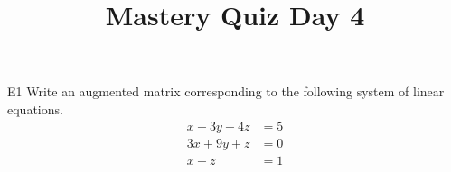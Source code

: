 \documentclass{sbgLAquiz}
\title{Mastery Quiz Day 4 }
\begin{document}
\begin{problem}{E1}
Write an augmented matrix corresponding to the following system of linear equations.
\begin{align*}
x+3y-4z &= 5 \\
3x+9y+z &= 0 \\
x-z &= 1
\end{align*}
\end{problem}
\end{document}
